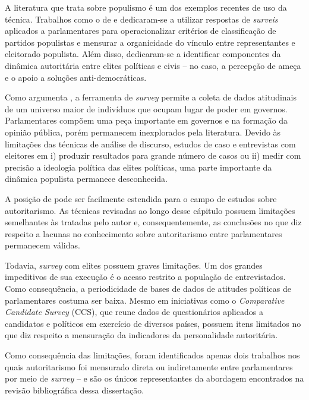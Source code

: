 \documentclass[
12pt,				%
openright,			%
twoside,			%
a4paper,			%
english,			%
french,				%
spanish,			%
brazil				%
]{abntex2}
\begin{document}
A literatura que trata sobre populismo é um dos exemplos recentes de uso da técnica. Trabalhos como o de  e  dedicaram-se a utilizar respostas de \emph{surveis} aplicados a parlamentares para operacionalizar critérios de classificação de partidos populistas e mensurar a organicidade do vínculo entre representantes e eleitorado populista. Além disso,  dedicaram-se a identificar componentes da dinâmica autoritária entre elites políticas e civis -- no caso, a percepção de ameça e o apoio a soluções anti-democráticas.

Como argumenta , a ferramenta de \emph{survey} permite a coleta de dados atitudinais de um universo maior de indivíduos que ocupam lugar de poder em governos. Parlamentares compõem uma peça importante em governos e na formação da opinião pública, porém permanecem inexplorados pela literatura. Devido às limitações das técnicas de análise de discurso, estudos de caso e entrevistas com eleitores em i) produzir resultados para grande número de casos ou ii) medir com precisão a ideologia política das elites políticas, uma parte importante da dinâmica populista permanece desconhecida. 

A posição de  pode ser facilmente estendida para o campo de estudos sobre autoritarismo. As técnicas revisadas ao longo desse cápitulo possuem limitações semelhantes às tratadas pelo autor e, consequentemente, as conclusões no que diz respeito a lacunas no conhecimento sobre autoritarismo entre parlamentares permanecem válidas. 

Todavia, \emph{survey} com elites possuem graves limitações. Um dos grandes impeditivos de sua execução é o acesso restrito a população de entrevistados. Como consequência, a periodicidade de bases de dados de atitudes políticas de parlamentares costuma ser baixa. Mesmo em iniciativas como o \emph{Comparative Candidate Survey} (CCS), que reune dados de questionários aplicados a candidatos e políticos em exercício de diversos países, possuem itens limitados no que diz respeito a mensuração da indicadores da personalidade autoritária. 

Como consequência das limitações, foram identificados apenas dois trabalhos nos quais autoritarismo foi mensurado direta ou indiretamente entre parlamentares por meio de \emph{survey} --  e  são os únicos representantes da abordagem encontrados na revisão bibliográfica dessa dissertação. 
\end{document}
